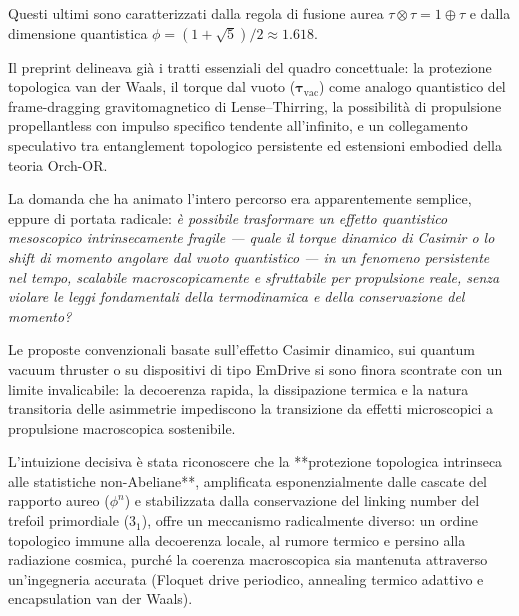 \documentclass[11pt,a4paper]{article}
\theoremstyle{plain}
\theoremstyle{definition}
\begin{document}
\vspace{0.2cm}



Questi ultimi sono caratterizzati dalla regola di fusione aurea $\tau \otimes \tau = 1 \oplus \tau$ e dalla dimensione quantistica $\phi = (1 + \sqrt{5})/2 \approx 1.618$. 


\vspace{0.3cm}



Il preprint delineava già i tratti essenziali del quadro concettuale: la protezione topologica van der Waals, il torque dal vuoto ($\boldsymbol{\tau}_\text{vac}$) come analogo quantistico del frame-dragging gravitomagnetico di Lense–Thirring, la possibilità di propulsione propellantless con impulso specifico tendente all’infinito, e un collegamento speculativo tra entanglement topologico persistente ed estensioni embodied della teoria Orch-OR.

\vspace{0.3cm}

La domanda che ha animato l’intero percorso era apparentemente semplice, eppure di portata radicale:  
\emph{è possibile trasformare un effetto quantistico mesoscopico intrinsecamente fragile — quale il torque dinamico di Casimir o lo shift di momento angolare dal vuoto quantistico — in un fenomeno persistente nel tempo, scalabile macroscopicamente e sfruttabile per propulsione reale, senza violare le leggi fondamentali della termodinamica e della conservazione del momento?}


\vspace{0.3cm}

Le proposte convenzionali basate sull’effetto Casimir dinamico, sui quantum vacuum thruster o su dispositivi di tipo EmDrive si sono finora scontrate con un limite invalicabile: la decoerenza rapida, la dissipazione termica e la natura transitoria delle asimmetrie impediscono la transizione da effetti microscopici a propulsione macroscopica sostenibile. 

\vspace{0.4cm}

L’intuizione decisiva è stata riconoscere che la **protezione topologica intrinseca alle statistiche non-Abeliane**, amplificata esponenzialmente dalle cascate del rapporto aureo ($\phi^n$) e stabilizzata dalla conservazione del linking number del trefoil primordiale ($3_1$), offre un meccanismo radicalmente diverso: un ordine topologico immune alla decoerenza locale, al rumore termico e persino alla radiazione cosmica, purché la coerenza macroscopica sia mantenuta attraverso un’ingegneria accurata (Floquet drive periodico, annealing termico adattivo e encapsulation van der Waals).
\end{document}
